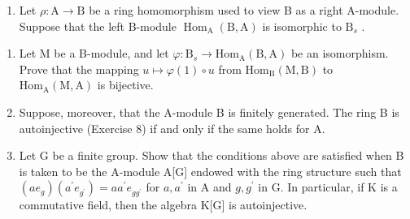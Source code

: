 \begin{enumerate}
\def\labelenumi{\arabic{enumi})}
\setcounter{enumi}{9}
\tightlist
\item
  Let \(\rho : \mathrm{A} \to \mathrm{B}\) be a ring homomorphism used to view B as a right A-module. Suppose that the left B-module \(\operatorname{Hom}_{\mathrm{A}}(\mathrm{B}, \mathrm{A})\) is isomorphic to \(\mathrm{B}_s\) .
\end{enumerate}

\begin{enumerate}
\def\labelenumi{\alph{enumi})}
\item
  Let M be a B-module, and let \(\varphi : \mathrm{B}_s \to \mathrm{Hom}_{\mathrm{A}}(\mathrm{B}, \mathrm{A})\) be an isomorphism. Prove that the mapping \(u \mapsto \varphi(1) \circ u\) from \(\mathrm{Hom}_{\mathrm{B}}(\mathrm{M}, \mathrm{B})\) to \(\mathrm{Hom}_{\mathrm{A}}(\mathrm{M}, \mathrm{A})\) is bijective.
\item
  Suppose, moreover, that the A-module B is finitely generated. The ring B is autoinjective (Exercise 8) if and only if the same holds for A.
\item
  Let G be a finite group. Show that the conditions above are satisfied when B is taken to be the A-module A{[}G{]} endowed with the ring structure such that \((ae_{g})(a^{\prime}e_{g^{\prime}})=aa^{\prime}e_{gg^{\prime}}\) for \(a,a^{\prime}\) in A and \(g,g^{\prime}\) in G. In particular, if K is a commutative field, then the algebra K{[}G{]} is autoinjective.
\end{enumerate}

